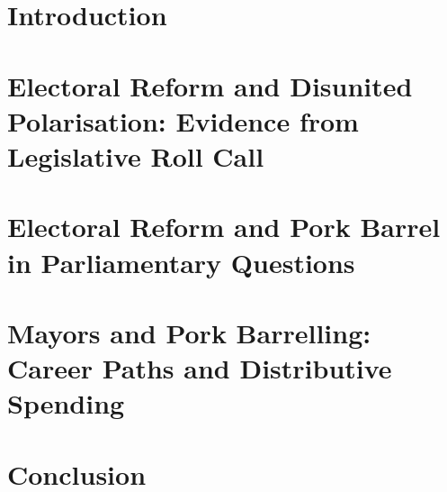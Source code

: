 \documentclass[12pt,leqno]{report}
\begin{document}
\chapter{Introduction}
\clearpage

\chapter{Electoral Reform and Disunited Polarisation: Evidence from Legislative Roll Call \label{chap:ch2}    } 
\clearpage
 
\chapter{Electoral Reform and Pork Barrel in Parliamentary Questions  \label{chap:ch3}  }
\clearpage

\chapter{Mayors and Pork Barrelling: Career Paths and Distributive Spending \label{chap:ch4}}
\clearpage

\chapter{Conclusion}
\clearpage

\appendix
\printbibliography
\end{document}
